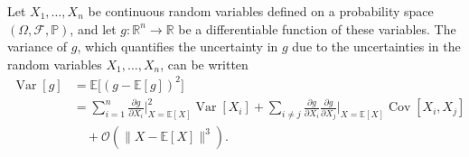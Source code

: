 \begin{definition}
	\label{def:error_propagation}
	Let $X_1, \dots, X_n$ be continuous random variables defined on a probability space $(\Omega, \mathcal{F}, \mathbb{P})$, and let 
	$g:\mathbb{R}^n \to \mathbb{R}$ be a differentiable function of these variables. The variance of $g$, which quantifies the uncertainty in $g$ due to the uncertainties in the random variables $X_1, \dots, X_n$, can be written
	\begin{equation}
		\begin{split}
			\operatorname{Var}[g] &= \mathbb{E}\big[(g - \mathbb{E}[g])^2\big] \\
			&= \sum_{i=1}^n  \frac{\partial g}{\partial X_i}\bigg|_{X = \mathbb{E}[X]}^2\operatorname{Var}[X_i] + \sum_{i \neq j} \frac{\partial g}{\partial X_i} \frac{\partial g}{\partial X_j}\bigg|_{X=\mathbb{E}[X]} \operatorname{Cov}[X_i, X_j]\\
			&\quad + \mathcal{O}(\|X - \mathbb{E}[X]\|^3).
		\end{split}
		\label{eq:var_approx}
	\end{equation}
\end{definition}

